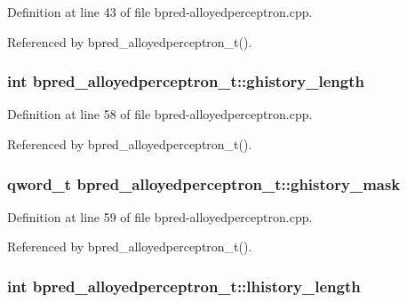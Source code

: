 Definition at line 43 of file bpred-alloyedperceptron.cpp.

Referenced by bpred\_\-alloyedperceptron\_\-t().
\subsubsection[{ghistory\_\-length}]{\setlength{\rightskip}{0pt plus 5cm}int {\bf bpred\_\-alloyedperceptron\_\-t::ghistory\_\-length}\hspace{0.3cm}{\tt  [protected]}}\label{classbpred__alloyedperceptron__t_215a322176a1680c946439949d84a610}




Definition at line 58 of file bpred-alloyedperceptron.cpp.

Referenced by bpred\_\-alloyedperceptron\_\-t().
\subsubsection[{ghistory\_\-mask}]{\setlength{\rightskip}{0pt plus 5cm}qword\_\-t {\bf bpred\_\-alloyedperceptron\_\-t::ghistory\_\-mask}\hspace{0.3cm}{\tt  [protected]}}\label{classbpred__alloyedperceptron__t_62328ebcbe413156beb595e3ddacb9ee}




Definition at line 59 of file bpred-alloyedperceptron.cpp.

Referenced by bpred\_\-alloyedperceptron\_\-t().
\subsubsection[{lhistory\_\-length}]{\setlength{\rightskip}{0pt plus 5cm}int {\bf bpred\_\-alloyedperceptron\_\-t::lhistory\_\-length}\hspace{0.3cm}{\tt  [protected]}}\label{classbpred__alloyedperceptron__t_1706124ee1c53e90627d1768dc18b6f0}




